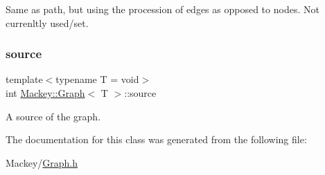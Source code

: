 Same as path, but using the procession of edges as opposed to nodes. Not currenltly used/set. 

\mbox{\label{classMackey_1_1Graph_a43657a07a21a2dcf422876400360ed5b}} 
\subsubsection{\texorpdfstring{source}{source}}
{\footnotesize\ttfamily template$<$typename T = void$>$ \\
int \hyperlink{classMackey_1_1Graph}{Mackey\+::\+Graph}$<$ T $>$\+::source\hspace{0.3cm}{\ttfamily [protected]}}



A source of the graph. 



The documentation for this class was generated from the following file\+:\begin{DoxyCompactItemize}
\item 
Mackey/\hyperlink{Graph_8h}{Graph.\+h}\end{DoxyCompactItemize}
